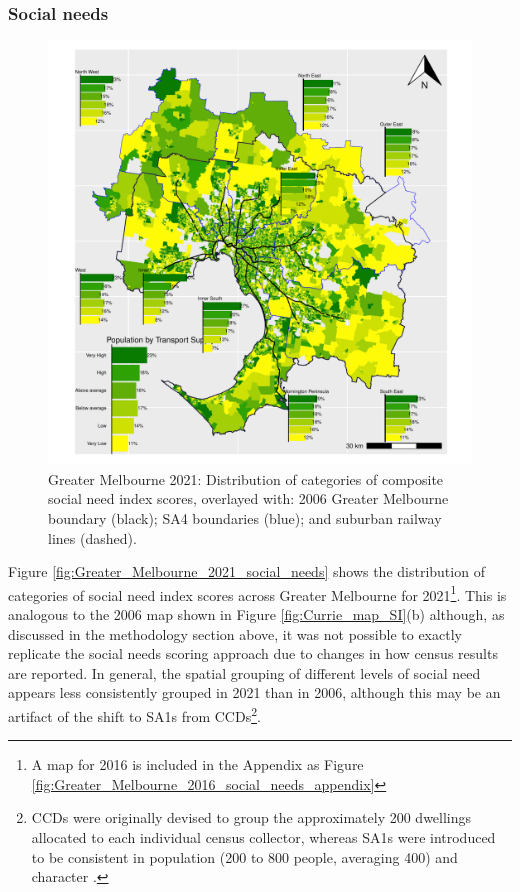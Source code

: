 \documentclass[preprint, 3p,
authoryear]{elsarticle} %
\begin{document}
\subsubsection{Social needs}\label{social-needs}

\begin{figure}
\centering
\includegraphics{ReynoldsCurrieQu2024_files/figure-latex/Greater_Melbourne_2021_social_needs-1.pdf}
\caption{Greater Melbourne 2021: Distribution of categories of composite
social need index scores, overlayed with: 2006 Greater Melbourne
boundary (black); SA4 boundaries (blue); and suburban railway lines
(dashed).}
\end{figure}

Figure \ref{fig:Greater_Melbourne_2021_social_needs} shows the
distribution of categories of social need index scores across Greater
Melbourne for 2021\footnote{A map for 2016 is included in the Appendix
  as Figure \ref{fig:Greater_Melbourne_2016_social_needs_appendix}}.
This is analogous to the 2006 map shown in Figure
\ref{fig:Currie_map_SI}(b) although, as discussed in the methodology
section above, it was not possible to exactly replicate the
\citet{currie2010identifying} social needs scoring approach due to
changes in how census results are reported. In general, the spatial
grouping of different levels of social need appears less consistently
grouped in 2021 than in 2006, although this may be an artifact of the
shift to SA1s from CCDs\footnote{CCDs were originally devised to group
  the approximately 200 dwellings allocated to each individual census
  collector, whereas SA1s were introduced to be consistent in population
  (200 to 800 people, averaging 400) and character
  \citep{ABS_SA1s_CCDs}.}.
\end{document}

